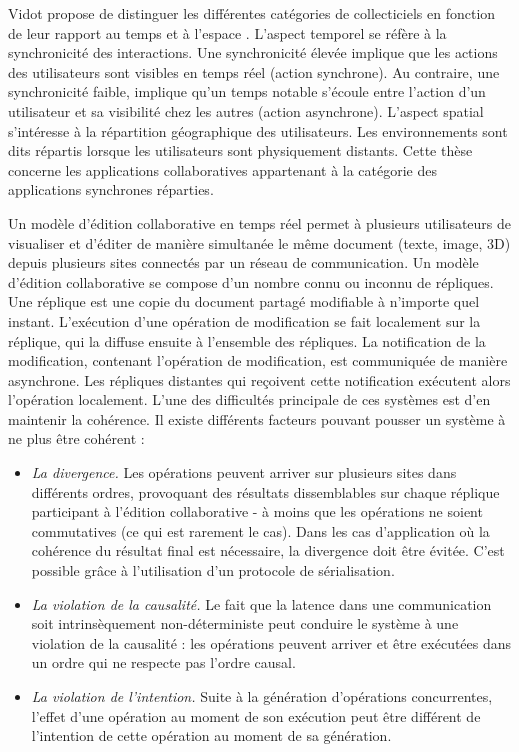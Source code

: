 Vidot propose de distinguer les différentes catégories de collecticiels en fonction 
de leur rapport au temps et à l'espace \cite{Vidot2002}. 
L'aspect temporel se réfère à la synchronicité des interactions. 
Une synchronicité élevée implique que les actions des utilisateurs sont visibles en 
temps réel (action synchrone). 
Au contraire, une synchronicité faible, implique qu'un temps notable s'écoule entre 
l'action d'un utilisateur et sa visibilité chez les autres (action asynchrone). L'aspect 
spatial s'intéresse à la répartition géographique des utilisateurs. Les 
environnements sont dits répartis lorsque les utilisateurs sont physiquement 
distants. Cette thèse concerne les applications collaboratives appartenant à la 
catégorie des applications synchrones réparties.

Un modèle d'édition collaborative en temps réel permet à plusieurs utilisateurs de 
visualiser et d'éditer de manière simultanée le même document (texte, image, 
\gls{3D}) 
depuis plusieurs sites connectés par un réseau de communication. Un modèle 
d'édition collaborative se compose d'un nombre connu ou inconnu de répliques. 
Une réplique est une copie du document partagé modifiable à n'importe quel 
instant. L'exécution d'une opération de modification se fait localement sur la 
réplique, qui la diffuse ensuite à l'ensemble des répliques. La notification de la 
modification, contenant l'opération de modification, est communiquée de manière 
asynchrone. Les répliques distantes qui reçoivent cette notification exécutent 
alors l'opération localement. L'une des difficultés principale de ces systèmes 
est d'en maintenir la cohérence. Il existe différents facteurs pouvant 
pousser un système à ne plus être cohérent :
\begin{itemize}
	\item \textit{La divergence.} Les opérations peuvent arriver sur plusieurs sites 
	dans différents ordres, provoquant des résultats dissemblables sur chaque réplique 
	participant à l'édition collaborative - à moins que les opérations ne soient 
	commutatives (ce qui est rarement le cas). Dans les cas d'application où la 
	cohérence du résultat final est nécessaire, la divergence doit être évitée. C'est possible grâce à l'utilisation d'un protocole de 
	sérialisation.
	\item \textit{La violation de la causalité.} Le fait que la latence dans une 
	communication 
	soit intrinsèquement non-déterministe peut conduire le système à une violation de 
	la causalité : les opérations peuvent arriver et être exécutées dans un ordre 
	qui ne respecte pas l'ordre causal.
	\item \textit{La violation de l'intention.} Suite à la génération d'opérations 
	concurrentes, 
	l'effet d'une opération au moment de son exécution peut être différent de 
	l'intention de cette opération au moment de sa génération.
\end{itemize}
